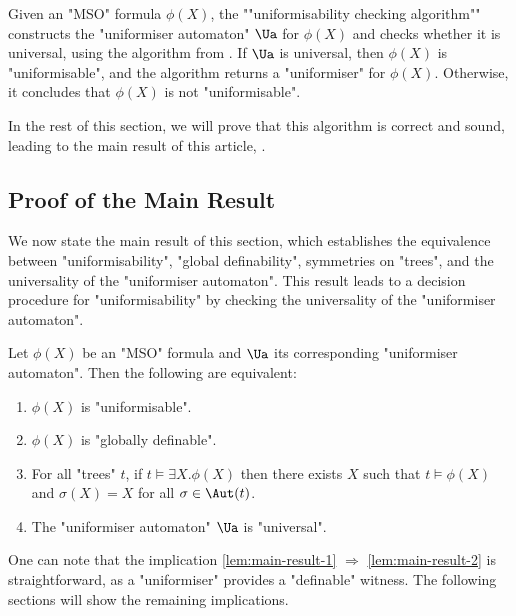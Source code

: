 \documentclass[a4paper,UKenglish,cleveref, autoref, thm-restate]{lipics-v2021}
\begin{document}
\begin{definition}
	\AP Given an "MSO" formula $\phi(X)$, the ""uniformisability checking algorithm"" constructs the "uniformiser automaton" $\Ua$ for $\phi(X)$ and checks whether it is universal,
	using the algorithm from .
	If $\Ua$ is universal, then $\phi(X)$ is "uniformisable", and the algorithm returns a "uniformiser" for $\phi(X)$. Otherwise, it concludes that $\phi(X)$ is not "uniformisable".
\end{definition}

In the rest of this section, we will prove that this algorithm is correct and sound, leading to the main result of this article, .


\subsection{Proof of the Main Result}

We now state the main result of this section, which establishes the equivalence between "uniformisability", "global definability", symmetries on "trees", and the universality of the "uniformiser automaton".
This result leads to a decision procedure for "uniformisability" by checking the universality of the "uniformiser automaton".

\begin{lemma}\label{lem:main-result}
	Let $\phi(X)$ be an "MSO" formula and $\Ua$ its corresponding "uniformiser automaton". Then the following are equivalent:
	\begin{enumerate}
		\item $\phi(X)$ is "uniformisable". \label{lem:main-result-1}
		\item $\phi(X)$ is "globally definable". \label{lem:main-result-2}
		\item For all "trees" $t$, if $t \models \exists X. \phi(X)$ then there exists $X$ such that $t \models \phi(X)$ and $\sigma(X) = X$ for all $\sigma \in \Aut(t)$. \label{lem:main-result-3}
		\item The "uniformiser automaton" $\Ua$ is "universal". \label{lem:main-result-4}
	\end{enumerate}
\end{lemma}

One can note that the implication \ref{lem:main-result-1} $\Rightarrow$ \ref{lem:main-result-2} is straightforward, as a "uniformiser" provides a "definable" witness.
The following sections will show the remaining implications.
\end{document}
